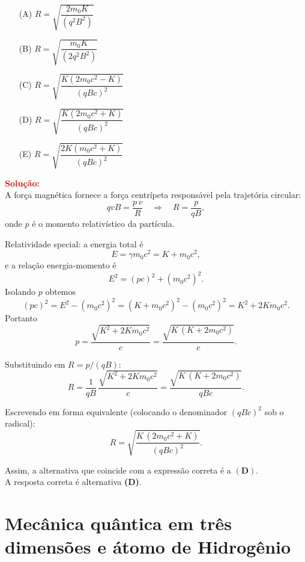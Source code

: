 \documentclass[a4paper,12pt]{article}
\begin{document}
\begin{flushleft}
\begin{itemize}
\item[(A)] \(R=\sqrt{\dfrac{2m_0K}{(q^2B^2)}}\)
\item[(B)] \(R=\sqrt{\dfrac{m_0K}{(2q^2B^2)}}\)
\item[(C)] \(R=\sqrt{\dfrac{K(2m_0c^2-K)}{(qBc)^2}}\)
\item[(D)] \(R=\sqrt{\dfrac{K(2m_0c^2+K)}{(qBc)^2}}\)
\item[(E)] \(R=\sqrt{\dfrac{2K(m_0c^2+K)}{(qBc)^2}}\)
\end{itemize}

\vspace{0.5cm}

\textcolor{red}{\textbf{Solução:}}\\

A força magnética fornece a força centrípeta responsável pela trajetória circular:
\[
qvB=\frac{p\,v}{R}\quad\Rightarrow\quad \boxed{R=\frac{p}{qB}},
\]
onde \(p\) é o momento relativístico da partícula.

Relatividade special: a energia total é
\[
E=\gamma m_0 c^2 = K + m_0 c^2,
\]
e a relação energia-momento é
\[
E^2=(pc)^2+(m_0 c^2)^2.
\]
Isolando \(p\) obtemos
\[
(pc)^2 = E^2-(m_0 c^2)^2 = (K+m_0 c^2)^2-(m_0 c^2)^2
=K^2+2K m_0 c^2.
\]
Portanto
\[
p=\frac{\sqrt{K^2+2K m_0 c^2}}{c}=\frac{\sqrt{K\,(K+2m_0 c^2)}}{c}.
\]

Substituindo em \(R=p/(qB)\):
\[
R=\frac{1}{qB}\,\frac{\sqrt{K^2+2K m_0 c^2}}{c}
=\frac{\sqrt{K\,(K+2m_0 c^2)}}{qB c}.
\]

Escrevendo em forma equivalente (colocando o denominador \((qBc)^2\) sob o radical):
\[
\boxed{R=\sqrt{\dfrac{K\,(2m_0 c^2+K)}{(qBc)^2}}}.
\]

Assim, a alternativa que coincide com a expressão correta é a \(\mathbf{(D)}\).\\

A resposta correta é alternativa \colorbox{green!50}{\textbf{(D)}}.
\end{flushleft}

\section{Mecânica quântica em três dimensões e átomo de Hidrogênio}
\end{document}
